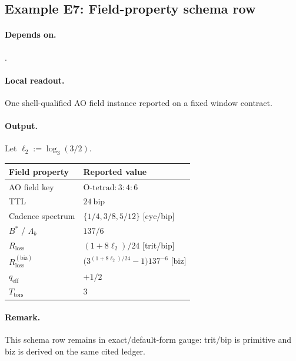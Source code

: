 \subsection{Example E7: Field-property schema row}\label{ex:e7}
\paragraph{Depends on.} .
\paragraph{Local readout.} One shell-qualified AO field instance reported on a fixed window contract.
\paragraph{Output.} Let $\ell_2:=\log_3(3/2)$.
{\footnotesize
\begin{center}
\begin{tabular}{@{}ll@{}}
\toprule
Field property & Reported value \\
\midrule
AO field key & $\mathrm{O\text{-}tetrad{:}3{:}4{:}6}$ \\
TTL & $24\ \mathrm{bip}$ \\
Cadence spectrum & $\{1/4,3/8,5/12\}$ [cyc/bip] \\
$B^*$ / $\Lambda_b$ & $137 / 6$ \\
$R_{\mathrm{loss}}$ & $(1+8\ell_2)/24$ [trit/bip] \\
$R_{\mathrm{loss}}^{(\mathrm{biz})}$ & $\bigl(3^{(1+8\ell_2)/24}-1\bigr)137^{-6}$ [biz] \\
$q_{\mathrm{eff}}$ & $+1/2$ \\
$T_{\mathrm{tors}}$ & $3$ \\
\bottomrule
\end{tabular}
\end{center}}
\paragraph{Remark.} This schema row remains in exact/default-form gauge: trit/bip is primitive and biz is derived on the same cited ledger.
